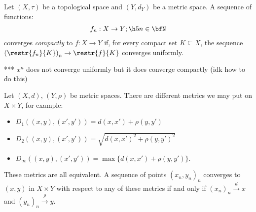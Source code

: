     \begin{definition}
        Let $(X,\tau)$ be a topological space and $(Y,d_Y)$ be a metric space. A sequence of functions:
            \begin{equation*}
            \begin{split}
                f_n:X \rightarrow Y; \h5 n \in \bfN
            \end{split}
            \end{equation*}
        converges \textit{compactly} to $f:X \rightarrow Y$ if, for every compact set $K \subseteq X$, the sequence $\left( \restr{f_n}{K} \right)_n \rightarrow \restr{f}{K}$ converges uniformly.
    \end{definition}

    \begin{example}***
        $x^n$ does not converge uniformly but it does converge compactly (idk how to do this)
    \end{example}

    \begin{center}
    \end{center}

    \begin{example}
        Let $(X,d)$, $(Y,\rho)$ be metric spaces. There are different metrics we may put on $X \times Y$, for example:
            \begin{itemize}
                \item $D_1((x,y),(x',y')) = d(x,x') + \rho(y,y')$ 
                \item $D_2((x,y),(x',y')) = \sqrt{d(x,x')^2 + \rho(y,y')^2}$
                \item $D_\infty((x,y),(x',y')) = \max\{d(x,x') + \rho(y,y')\}$.
            \end{itemize}
        These metrics are all equivalent. A sequence of points $(x_n,y_n)_n$ converges to $(x,y)$ in $X \times Y$ with respect to any of these metrics if and only if $(x_n)_n \xrightarrow{d} x$ and $(y_n)_n \xrightarrow{\rho} y$.
    \end{example}

